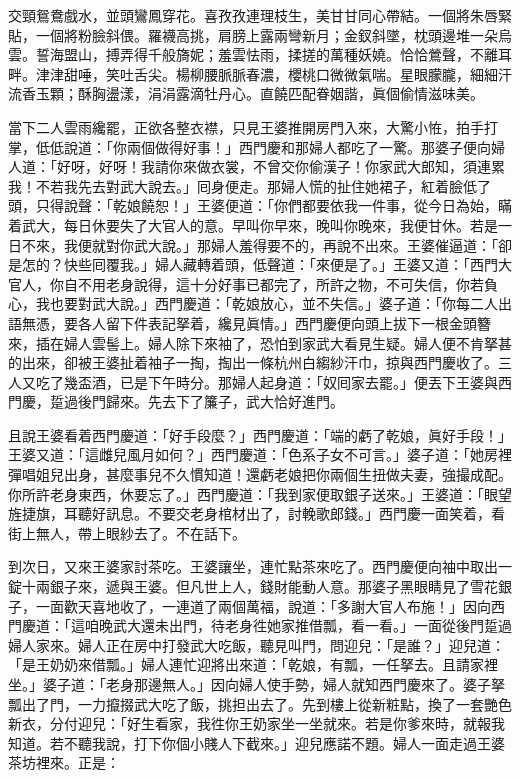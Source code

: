 \begin{myquote} 
交頸鴛鴦戲水，並頭鸞鳳穿花。喜孜孜連理枝生，美甘甘同心帶結。一個將朱唇緊貼，一個將粉臉斜偎。羅襪高挑，肩膀上露兩彎新月；金釵斜墜，枕頭邊堆一朵烏雲。{}誓海盟山，搏弄得千般旖妮；羞雲怯雨，揉搓的萬種妖嬈。恰恰鶯聲，不離耳畔。津津甜唾，笑吐舌尖。楊柳腰脈脈春濃，櫻桃口微微氣喘。星眼朦朧，細細汗流香玉顆；酥胸盪漾，涓涓露滴牡丹心。直饒匹配眷姻諧，眞個偷情滋味美。
\end{myquote} 

當下二人雲雨纔罷，正欲各整衣襟，只見王婆推開房門入來，大驚小恠，拍手打掌，低低說道：{}「你兩個做得好事！」西門慶和那婦人都吃了一驚。那婆子便向婦人道：「好呀，好呀！我請你來做衣裳，不曾交你偷漢子！{}你家武大郎知，須連累我！不若我先去對武大說去。」囘身便走。那婦人慌的扯住她裙子，紅着臉低了頭，只得說聲：「乾娘饒恕！」{}王婆便道：「你們都要依我一件事，從今日為始，瞞着武大，每日休要失了大官人的意。早叫你早來，晚叫你晚來，我便甘休。若是一日不來，我便就對你武大說。」那婦人羞得要不的，再說不出來。王婆催逼道：「卻是怎的？快些囘覆我。」婦人藏轉着頭，低聲道：「來便是了。」王婆又道：「西門大官人，你自不用老身說得，這十分好事已都完了，所許之物，不可失信，{}你若負心，我也要對武大說。」西門慶道：「乾娘放心，並不失信。」婆子道：「你每二人出語無憑，要各人留下件表記拏着，纔見眞情。」西門慶便向頭上拔下一根金頭簪來，插在婦人雲髻上。婦人除下來袖了，恐怕到家武大看見生疑。婦人便不肯拏甚的出來，卻被王婆扯着袖子一掏，掏出一條杭州白縐紗汗巾，掠與西門慶收了。{}三人又吃了幾盃酒，已是下午時分。那婦人起身道：「奴囘家去罷。」便丟下王婆與西門慶，踅過後門歸來。先去下了簾子，武大恰好進門。

且說王婆看着西門慶道：「好手段麼？」西門慶道：「端的虧了乾娘，眞好手段！」王婆又道：「這雌兒風月如何？」西門慶道：「色系子女不可言。」婆子道：「她房裡彈唱姐兒出身，甚麼事兒不久慣知道！還虧老娘把你兩個生扭做夫妻，強撮成配。你所許老身東西，休要忘了。」西門慶道：「我到家便取銀子送來。」王婆道：「眼望旌捷旗，耳聽好訊息。不要交老身棺材出了，討輓歌郎錢。」{}西門慶一面笑着，看街上無人，帶上眼紗去了。不在話下。

到次日，又來王婆家討茶吃。王婆讓坐，連忙點茶來吃了。西門慶便向袖中取出一錠十兩銀子來，遞與王婆。但凡世上人，錢財能動人意。那婆子黑眼睛見了雪花銀子，一面歡天喜地收了，一連道了兩個萬福，說道：「多謝大官人布施！」{}因向西門慶道：「這咱晚武大還未出門，待老身徃她家推借瓢，看一看。」一面從後門踅過婦人家來。婦人正在房中打發武大吃飯，聽見叫門，問迎兒：「是誰？」迎兒道：「是王奶奶來借瓢。」婦人連忙迎將出來道：「乾娘，有瓢，一任拏去。且請家裡坐。」婆子道：「老身那邊無人。」因向婦人使手勢，婦人就知西門慶來了。{}婆子拏瓢出了門，一力攛掇武大吃了飯，挑担出去了。先到樓上從新粧點，換了一套艷色新衣，分付迎兒：「好生看家，我徃你王奶家坐一坐就來。若是你爹來時，就報我知道。若不聽我說，打下你個小賤人下截來。」迎兒應諾不題。婦人一面走過王婆茶坊裡來。正是：

